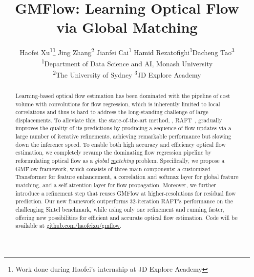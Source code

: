 \documentclass[10pt,twocolumn,letterpaper]{article}
\begin{document}
\title{GMFlow: Learning Optical Flow via Global Matching}


\author{{Haofei Xu\textsuperscript{1}\thanks{Work done during Haofei's internship at JD Explore Academy} \quad Jing Zhang\textsuperscript{2} \quad Jianfei Cai\textsuperscript{1}  \quad Hamid Rezatofighi\textsuperscript{1}\quad Dacheng Tao\textsuperscript{3}} \\
{\normalsize \textsuperscript{1}Department of Data Science and AI, Monash University }
\\
{\normalsize \textsuperscript{2}The University of Sydney}
\quad 
{\normalsize \textsuperscript{3}JD Explore Academy}
}


\maketitle

\begin{abstract}









Learning-based optical flow estimation has been dominated with the pipeline of cost volume with convolutions for flow regression, which is inherently limited to local correlations and thus is hard to address the long-standing challenge of large displacements. To alleviate this, the state-of-the-art method, \ie, RAFT~\cite{teed2020raft}, gradually improves the quality of its predictions by producing a sequence of flow updates via a large number of iterative refinements, achieving remarkable performance but slowing down the inference speed. To enable both high accuracy and efficiency optical flow estimation, we completely revamp the dominating flow regression pipeline by reformulating optical flow as a \emph{\underline{g}lobal \underline{m}atching} problem. Specifically, we propose a GMFlow framework, which consists of three main components: a customized Transformer for feature enhancement, a correlation and softmax layer for global feature matching, and a self-attention layer for flow propagation. Moreover, we further introduce a refinement step that reuses GMFlow at higher-resolutions for residual flow prediction.
Our new framework outperforms 32-iteration RAFT's performance on the challenging Sintel benchmark, while using only one refinement and running faster, offering new possibilities for efficient and accurate optical flow estimation. Code will be available at \href{https://github.com/haofeixu/gmflow}{github.com/haofeixu/gmflow}.


   
\end{abstract}
\end{document}
